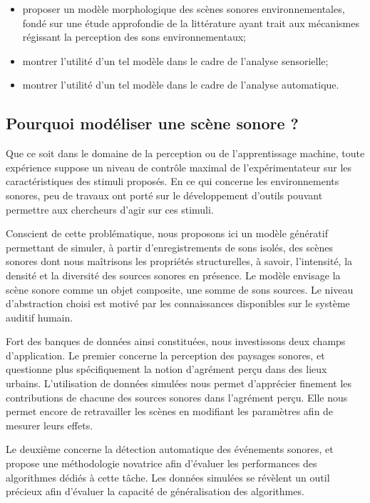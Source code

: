 \begin{itemize}
\item proposer un modèle morphologique des scènes sonores environnementales, fondé sur une étude approfondie de la littérature ayant trait aux mécanismes régissant la perception des sons environnementaux;
\item montrer l'utilité d'un tel modèle dans le cadre de l'analyse sensorielle;
\item montrer l'utilité d'un tel modèle dans le cadre de l'analyse automatique.
\end{itemize}

\subsection{Pourquoi modéliser une scène sonore ?}

Que ce soit dans le domaine de la perception ou de l'apprentissage machine, toute expérience suppose un niveau de contrôle maximal de l'expérimentateur sur les caractéristiques des stimuli proposés. En ce qui concerne les environnements sonores, peu de travaux ont porté sur le développement d’outils pouvant permettre aux chercheurs d'agir sur ces stimuli.

Conscient de cette problématique, nous proposons ici un modèle génératif permettant de simuler, à partir d'enregistrements de sons isolés, des scènes sonores dont nous maîtrisons les propriétés structurelles, à savoir, l'intensité, la densité et la diversité des sources sonores en présence. Le modèle envisage la scène sonore comme un objet composite, une somme de sons sources. Le niveau d'abstraction choisi est motivé par les connaissances disponibles sur le système auditif humain.

Fort des banques de données ainsi constituées, nous investissons deux champs d'application. Le premier concerne la perception des paysages sonores, et questionne plus spécifiquement la notion d'agrément perçu dans des lieux urbains. L'utilisation de données simulées nous permet d'apprécier finement les contributions de chacune des sources sonores dans l'agrément perçu. Elle nous permet encore de retravailler les scènes en modifiant les paramètres afin de mesurer leurs effets.

Le deuxième concerne la détection automatique des événements sonores, et propose une méthodologie novatrice afin d'évaluer les performances des algorithmes dédiés à cette tâche. Les données simulées se révèlent un outil précieux afin d'évaluer la capacité de généralisation des algorithmes.

